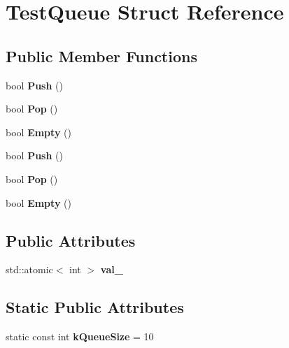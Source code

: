 \hypertarget{struct_test_queue}{}\section{Test\+Queue Struct Reference}
\label{struct_test_queue}
\subsection*{Public Member Functions}
\begin{DoxyCompactItemize}
\item 
\mbox{\label{struct_test_queue_a72852e47ce4223605a95120bba1ccde0}} 
bool {\bfseries Push} ()
\item 
\mbox{\label{struct_test_queue_a46626e8be073f6c8ed0eb667b67fec21}} 
bool {\bfseries Pop} ()
\item 
\mbox{\label{struct_test_queue_a05975336c5f8eaea13ab2b7d81e26494}} 
bool {\bfseries Empty} ()
\item 
\mbox{\label{struct_test_queue_a72852e47ce4223605a95120bba1ccde0}} 
bool {\bfseries Push} ()
\item 
\mbox{\label{struct_test_queue_a46626e8be073f6c8ed0eb667b67fec21}} 
bool {\bfseries Pop} ()
\item 
\mbox{\label{struct_test_queue_a05975336c5f8eaea13ab2b7d81e26494}} 
bool {\bfseries Empty} ()
\end{DoxyCompactItemize}
\subsection*{Public Attributes}
\begin{DoxyCompactItemize}
\item 
\mbox{\label{struct_test_queue_a94242457cd0db5aec51350c93fd0ec16}} 
std\+::atomic$<$ int $>$ {\bfseries val\+\_\+}
\end{DoxyCompactItemize}
\subsection*{Static Public Attributes}
\begin{DoxyCompactItemize}
\item 
\mbox{\label{struct_test_queue_a35b33c570129f182ffc432d8031848e3}} 
static const int {\bfseries k\+Queue\+Size} = 10
\end{DoxyCompactItemize}


